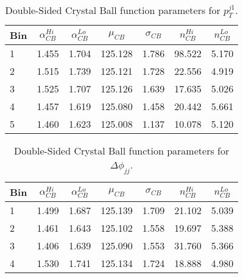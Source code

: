 \begin{table}[h]
\centering
\small
\caption{Double-Sided Crystal Ball function parameters for $p_T^{j1}$.}
\vspace{0.4cm}
\begin{tabular}{l | cccccc}
Bin &  $\alpha_{CB}^{Hi}$ &  $\alpha_{CB}^{Lo}$ &  $\mu_{CB}$ &  $\sigma_{CB}$ &  $n_{CB}^{Hi}$ &  $n_{CB}^{Lo}$ \\
\hline
1   &                     1.455 &                     1.704 &     125.128 &          1.786 &                98.522 &                 5.170 \\
2   &                     1.515 &                     1.739 &     125.121 &          1.728 &                22.556 &                 4.919 \\
3   &                     1.525 &                     1.707 &     125.126 &          1.639 &                17.635 &                 5.026 \\
4   &                     1.457 &                     1.619 &     125.080 &          1.458 &                20.442 &                 5.661 \\
5   &                     1.460 &                     1.623 &     125.008 &          1.137 &                10.078 &                 5.120 \\
\end{tabular}
\end{table}

\begin{table}[h]
\centering
\small
\caption{Double-Sided Crystal Ball function parameters for $\Delta \phi_{jj}$.}
\vspace{0.4cm}
\begin{tabular}{l | cccccc}
Bin &  $\alpha_{CB}^{Hi}$ &  $\alpha_{CB}^{Lo}$ &  $\mu_{CB}$ &  $\sigma_{CB}$ &  $n_{CB}^{Hi}$ &  $n_{CB}^{Lo}$ \\
\hline
1   &                     1.499 &                     1.687 &     125.139 &          1.709 &                21.102 &                 5.039 \\
2   &                     1.461 &                     1.643 &     125.102 &          1.558 &                19.697 &                 5.388 \\
3   &                     1.406 &                     1.639 &     125.090 &          1.553 &                31.760 &                 5.366 \\
4   &                     1.530 &                     1.741 &     125.134 &          1.724 &                18.888 &                 4.980 \\
\end{tabular}
\end{table}

